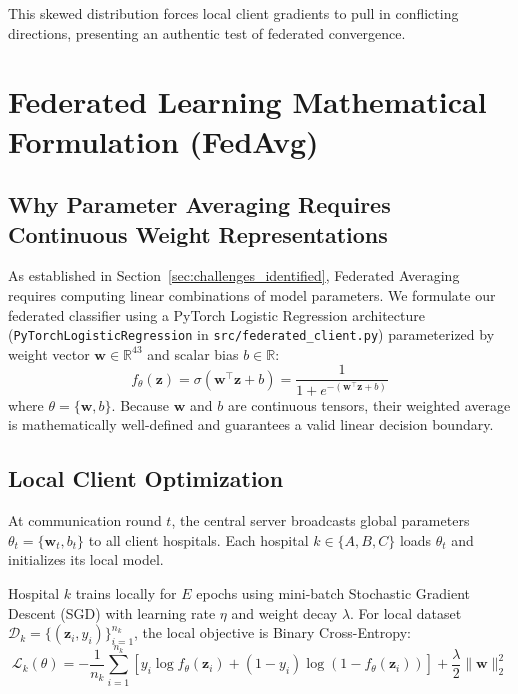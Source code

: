 \documentclass[12pt,a4paper,oneside]{report}
\begin{document}
This skewed distribution forces local client gradients to pull in conflicting directions, presenting an authentic test of federated convergence.

\section{Federated Learning Mathematical Formulation (FedAvg)}
\label{sec:fedavg_formulation}

\subsection{Why Parameter Averaging Requires Continuous Weight Representations}
\label{subsec:why_continuous_weights}

As established in Section~\ref{sec:challenges_identified}, Federated Averaging requires computing linear combinations of model parameters. We formulate our federated classifier using a PyTorch Logistic Regression architecture (\texttt{PyTorchLogisticRegression} in \texttt{src/federated\_client.py}) parameterized by weight vector $\mathbf{w} \in \mathbb{R}^{43}$ and scalar bias $b \in \mathbb{R}$:
\begin{equation}
f_{\theta}(\mathbf{z}) = \sigma(\mathbf{w}^\top \mathbf{z} + b) = \frac{1}{1 + e^{-(\mathbf{w}^\top \mathbf{z} + b)}}
\end{equation}
where $\theta = \{\mathbf{w}, b\}$. Because $\mathbf{w}$ and $b$ are continuous tensors, their weighted average is mathematically well-defined and guarantees a valid linear decision boundary.

\subsection{Local Client Optimization}
\label{subsec:local_optimization}

At communication round $t$, the central server broadcasts global parameters $\theta_t = \{\mathbf{w}_t, b_t\}$ to all client hospitals. Each hospital $k \in \{A, B, C\}$ loads $\theta_t$ and initializes its local model.

Hospital $k$ trains locally for $E$ epochs using mini-batch Stochastic Gradient Descent (SGD) with learning rate $\eta$ and weight decay $\lambda$. For local dataset $\mathcal{D}_k = \{(\mathbf{z}_{i}, y_{i})\}_{i=1}^{n_k}$, the local objective is Binary Cross-Entropy:
\begin{equation}
\label{eq:local_loss}
\mathcal{L}_k(\theta) = -\frac{1}{n_k} \sum_{i=1}^{n_k} \left[ y_i \log f_{\theta}(\mathbf{z}_i) + (1 - y_i) \log(1 - f_{\theta}(\mathbf{z}_i)) \right] + \frac{\lambda}{2} \|\mathbf{w}\|_2^2
\end{equation}
\end{document}
